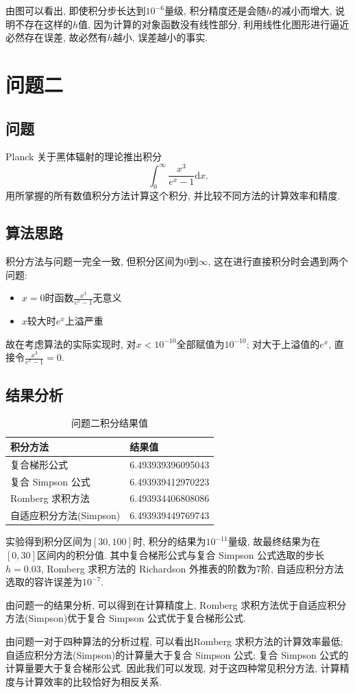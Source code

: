 \documentclass[UTF8,ctexart,a4paper,11pt,openany]{article}
\theoremstyle{definition}
\begin{document}
    由图可以看出, 即使积分步长达到$10^{-6}$量级, 积分精度还是会随$h$的减小而增大, 说明不存在这样的$h$值, 因为计算的对象函数没有线性部分, 利用线性化图形进行逼近必然存在误差, 故必然有$h$越小, 误差越小的事实. 
\section{问题二} 
    \subsection{问题}
    Planck 关于黑体辐射的理论推出积分$$\int_{0}^{\infty}\frac{x^3}{e^x - 1} \mathrm{d}x .$$
    用所掌握的所有数值积分方法计算这个积分, 并比较不同方法的计算效率和精度.
    \subsection{算法思路}
    积分方法与问题一完全一致, 但积分区间为$0$到$\infty$, 这在进行直接积分时会遇到两个问题: 
    \begin{itemize}
        \item $x=0$时函数$\frac{x^3}{e^x - 1}$无意义
        \item $x$较大时$e^x$上溢严重
    \end{itemize}
    故在考虑算法的实际实现时, 对$x<10^{-10}$全部赋值为$10^{-10}$; 对大于上溢值的$e^x$, 直接令$\frac{x^3}{e^x - 1}=0$.
    \subsection{结果分析}
    \begin{table}[H]
        \centering
        \begin{tabular}{ll}
            \toprule
            积分方法             & 结果值               \\ \midrule
            复合梯形公式           & 6.493939396095043 \\
            复合 Simpson 公式    & 6.493939412970223 \\
            Romberg 求积方法     & 6.493934406808086 \\
            自适应积分方法(Simpson) & 6.493939449769743 \\ \bottomrule
        \end{tabular}
        \caption{问题二积分结果值}
    \end{table}
    实验得到积分区间为$[30, 100]$时, 积分的结果为$10^{-11}$量级, 故最终结果为在$[0, 30]$区间内的积分值. 其中复合梯形公式与复合 Simpson 公式选取的步长$h=0.03$, Romberg 求积方法的 Richardson 外推表的阶数为7阶, 自适应积分方法选取的容许误差为$10^{-7}$. \par 由问题一的结果分析, 可以得到在计算精度上, Romberg 求积方法优于自适应积分方法(Simpson)优于复合 Simpson 公式优于复合梯形公式. \par 由问题一对于四种算法的分析过程, 可以看出Romberg 求积方法的计算效率最低; 自适应积分方法(Simpson)的计算量大于复合 Simpson 公式; 复合 Simpson 公式的计算量要大于复合梯形公式. 因此我们可以发现, 对于这四种常见积分方法, 计算精度与计算效率的比较恰好为相反关系. 
\end{document}
